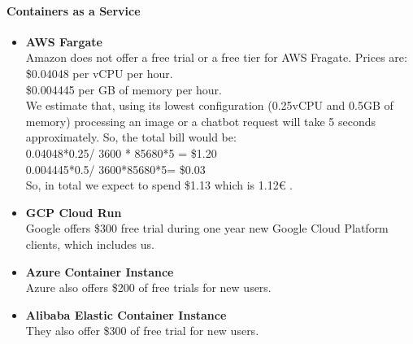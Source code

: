 \documentclass[11pt]{article}
\begin{document}
\paragraph{Containers as a Service}
\begin{itemize}
\item \textbf{AWS Fargate} \\
Amazon does not offer a free trial or a free tier for AWS Fragate.
Prices are:  \\
\$0.04048 per vCPU per hour. \\
\$0.004445 per GB of memory per hour. \\
We estimate that, using its lowest configuration (0.25vCPU and 0.5GB of memory) processing an image or a chatbot request will take 5 seconds approximately. So, the total bill would be: \\
0.04048*0.25/ 3600 * 85680*5 = \$1.20 \\
0.004445*0.5/ 3600*85680*5= \$0.03 \\
So, in total we expect to spend \$1.13 which is 1.12\euro{} .

\item \textbf{GCP Cloud Run} \\
Google offers \$300 free trial during one year new Google Cloud Platform clients, which includes us.

\item \textbf{Azure Container Instance} \\
Azure also offers \$200 of free trials for new users.

\item \textbf{Alibaba Elastic Container Instance} \\
They also offer \$300 of free trial for new users.
\end{itemize}
\end{document}
